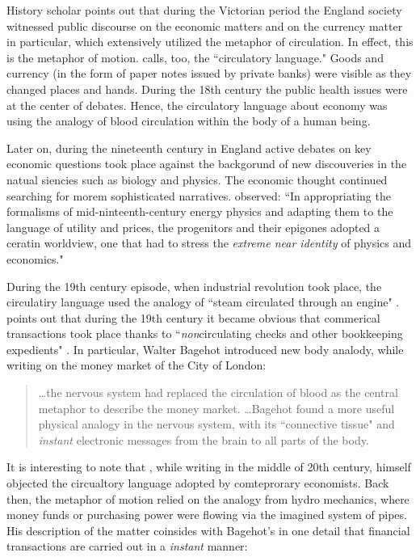 History scholar \citeauthor{alborn1994} points out that during the Victorian period the England society witnessed public discourse on the economic matters and on the currency matter in particular, which extensively utilized the  metaphor of circulation. In effect, this is the metaphor of motion. \citeauthor{alborn1994} calls, too, the ``circulatory language." Goods and currency (in the form of paper notes issued by private banks) were visible as they changed places and hands. During the 18th century the public health issues were at the center of debates. Hence, the circulatory language about economy was using the analogy of blood circulation within the body of a human being. 

Later on, during the nineteenth century in England active debates on key economic questions took place against the backgorund of new discouveries in the natual siencies such as biology and physics. The economic thought continued searching for morem sophisticated narratives. \cite[p.~10, emphasis added]{mirowski1994} observed: ``In appropriating the formalisms of mid-ninteenth-century energy physics and adapting them to the language of utility and prices, the progenitors and their epigones adopted a ceratin worldview, one that had to stress the \textit{extreme near identity} of physics and economics."
 
During the 19th century episode, when industrial revolution took place, the circulatiry language used the analogy of ``steam circulated through an engine" \citep[p.~176]{alborn1994}. \citeauthor{alborn1994} points out that during the 19th century it became obvious that commerical transactions took place thanks to ``\textit{non}circulating checks and other bookkeeping expedients" \citep[p.~177, emphasis original]{alborn1994}. In particular,  Walter Bagehot introduced new body analody, while writing on the money market of the City of London: 

\begin{quote}
\dots the nervous system had replaced the circulation of blood as the central metaphor to describe the money market. \dots Bagehot found a more useful physical analogy in the nervous system, with its ``connective tissue" and \textit{instant} electronic messages from the brain to all parts of the body. \citep[p.~190, emphasis added]{alborn1994}
\end{quote}

It is interesting to note that \citeauthor{copeland1952}, while writing in the middle of 20th century, himself objected the circualtory language adopted by comteprorary economists. Back then, the metaphor of motion relied on the analogy from hydro mechanics, where money funds or purchasing power were flowing via the imagined system of pipes. His description of the matter coinsides with Bagehot's in one detail that financial transactions are carried out in a \textit{instant} manner: 

